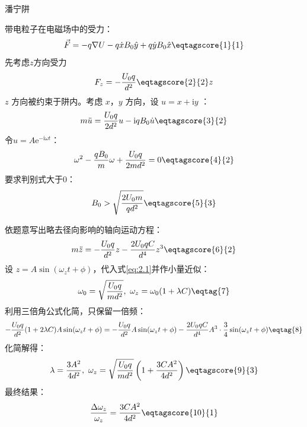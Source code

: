 \documentclass[answer]{cphos}
\begin{document}
\begin{problem}[40]{潘宁阱}
\begin{solution}
带电粒子在电磁场中的受力：
\begin{equation}
	\vec{F} = -q\nabla U -q\dot{x}B_0\hat{y}+q\dot{y}B_0\hat{x}\eqtagscore{1}{1} 
\end{equation}
先考虑$z$方向受力
\begin{equation}
	F_z=-\frac{U_0 q}{d^2} \eqtagscore{2}{2} z
\end{equation}
$z$ 方向被约束于阱内。考虑 $x$，$y$ 方向，设 $u=x+\mathrm{i} y$ ：
\begin{equation}
	m\ddot{u} = \frac{U_0 q}{2d^2}u-\mathrm{i} qB_0 \dot{u}\eqtagscore{3}{2} 
\end{equation}
令$u=A\mathrm{e}^{-\mathrm{i} \omega t}$：
\begin{equation}
	\omega^2-\frac{ q B_0}{m} \omega+ \frac{U_0 q}{2md^2} =0 \eqtagscore{4}{2}
\end{equation}
要求判别式大于$0$：
\begin{equation}
	B_0>\sqrt{\frac{2U_0 m}{qd^2}}\eqtagscore{5}{3}
\end{equation}

依题意写出略去径向影响的轴向运动方程：
\begin{equation}
	m\ddot{z}=-\frac{U_0 q}{d^2}z-\frac{2U_0 qC}{d^4}z^{3}\eqtagscore{6}{2}\label{eq:2.1}
\end{equation}
设 $z=A\sin \left(\omega_z t+\phi\right)$，代入式\ref{eq:2.1}并作小量近似：
\begin{equation}
	\omega_0=\sqrt{\frac{U_0q}{md^2}},\ \omega_z=\omega_0(1+\lambda C)\eqtag{7}
\end{equation}
利用三倍角公式化简，只保留一倍频：
\begin{equation}
	-\frac{U_0q}{d^2}(1+2\lambda C)A\sin(\omega_zt+\phi)=-\frac{U_0q}{d^2}A\sin(\omega_zt+\phi)-\frac{2U_0qC}{d^4}A^3\cdot\frac34\sin(\omega_zt+\phi)\eqtag{8}
\end{equation}
化简解得：
\begin{equation}
	\lambda=\dfrac{3A^2}{4d^2},\ \omega_z=\sqrt{\frac{U_0 q}{md^2}}\left(1+\frac{3CA^2}{4d^2}\right)\eqtagscore{9}{3}
\end{equation}
最终结果：
\begin{equation}
	\frac{\Delta \omega_z}{\omega_z} = \frac{3CA^2}{4d^2} \eqtagscore{10}{1}
\end{equation}


\end{solution}
\end{problem}
\end{document}
